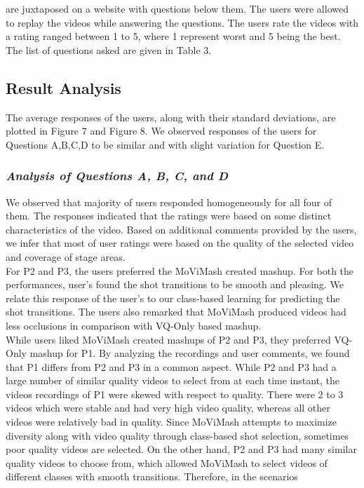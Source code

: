 \documentclass{sig-alternate}
\begin{document}
{{{are juxtaposed on a website with questions below them. The users 
were allowed to replay the videos while answering the questions.
The users rate the videos with a rating ranged between 1 to 5, where
1 represent worst and 5 being the best. The list of questions asked
are given in Table 3.

\subsection{Result Analysis}
The average responses of the users, along with their standard
deviations, are plotted in Figure 7 and Figure 8. We observed responses
of the users for Questions A,B,C,D to be similar and with
slight variation for Question E.
\subsubsection{\textit{Analysis of Questions A, B, C, and D}}
We observed that majority of users responded homogeneously
for all four of them. The responses indicated that the ratings were
based on some distinct characteristics of the video. Based on additional
comments provided by the users, we infer that most of user
ratings were based on the quality of the selected video and coverage
of stage areas.\\
For P2 and P3, the users preferred the MoViMash created mashup.
For both the performances, user’s found the shot transitions to be
smooth and pleasing. We relate this response of the user’s to our
class-based learning for predicting the shot transitions. The users
also remarked that MoViMash produced videos had less occlusions
in comparison with VQ-Only based mashup.\\
While users liked MoViMash created mashups of P2 and P3,
they preferred VQ-Only mashup for P1. By analyzing the recordings
and user comments, we found that P1 differs from P2 and P3 in
a common aspect. While P2 and P3 had a large number of similar
quality videos to select from at each time instant, the videos recordings
of P1 were skewed with respect to quality. There were 2 to 3
videos which were stable and had very high video quality, whereas
all other videos were relatively bad in quality. Since MoViMash
attempts to maximize diversity along with video quality through
class-based shot selection, sometimes poor quality videos are selected.
On the other hand, P2 and P3 had many similar quality videos
to choose from, which allowed MoViMash to select videos of different
classes with smooth transitions. Therefore, in the scenarios
}}}
\end{document}
